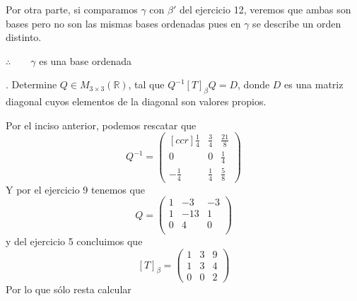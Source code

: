 \documentclass[letterpaper]{article}
\renewcommand{\*}{\cdot}
\newcommand{\T}{\begin{pmatrix}
		1 & 3 & 9 \\
		1 & 3 & 4 \\
		0 & 0 & 2 
\end{pmatrix} }
\theoremstyle{definition}
\begin{document}
Por otra parte, si comparamos $ \gamma $ con $ \beta' $ del ejercicio 12, veremos que ambas son bases pero no son las mismas bases ordenadas pues en $ \gamma $ se describe un orden distinto. 
\begin{center}
	$ \therefore \qquad \gamma$  es una base ordenada
\end{center}

. Determine $Q \in M_{3\times 3}(\mathbb{R})$, tal que $Q^{-1}[T]_{\beta} Q = D$, donde $D$ es una matriz diagonal cuyos elementos de la diagonal son valores propios.


Por el inciso anterior, podemos rescatar que $$ Q^{-1} = \begin{pmatrix}[ccr]
\frac{1}{4} &\frac{3}{4} & \frac{21}{8} \\
0 & 0 & \frac{1}{4}\\
-\frac{1}{4} & \frac{1}{4} & \frac{5}{8}
\end{pmatrix} $$
Y por el ejercicio 9 tenemos que \[  Q = \begin{pmatrix}
1 & -3 & -3\\
1 & -13 & 1\\
0 & 4 & 0\\
\end{pmatrix}  \] y del ejercicio 5 concluimos que \[ [T]_\beta = \T \] Por lo que sólo resta calcular
\end{document}
